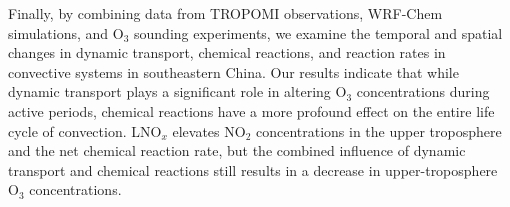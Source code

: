 {Finally, by combining data from TROPOMI observations, WRF-Chem simulations, and O$_3$ sounding experiments,
we examine the temporal and spatial changes in dynamic transport, chemical reactions, and reaction rates in convective systems in southeastern China.
Our results indicate that while dynamic transport plays a significant role in altering O$_3$ concentrations during active periods, chemical reactions have a more profound effect on the entire life cycle of convection.
LNO$_x$ elevates NO$_2$ concentrations in the upper troposphere and the net chemical reaction rate,
but the combined influence of dynamic transport and chemical reactions still results in a decrease in upper-troposphere O$_3$ concentrations.
}
